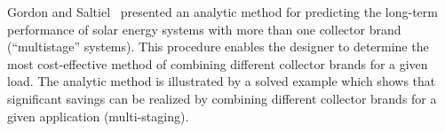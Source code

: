 Gordon and Saltiel~\cite{Gordon1986} presented an analytic method for predicting the long-term performance of solar energy systems with more than one collector brand (``multistage'' systems). This procedure enables the designer to determine the most cost-effective method of combining different collector brands for a given load. The analytic method is illustrated by a solved example which shows that significant savings can be realized by combining different collector brands for a given application (multi-staging).


